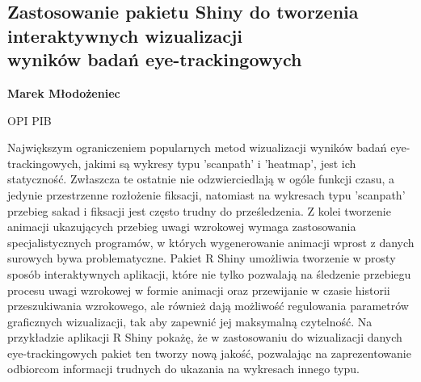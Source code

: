 \documentclass[\main/boa.tex]{subfiles}
\begin{document}
\subsection{Zastosowanie pakietu Shiny do tworzenia interaktywnych wizualizacji\\ wyników badań eye-trackingowych}

\begin{minipage}{0.915\textwidth}
	\centering
  {\bf {} Marek Młodożeniec}
\end{minipage}


\begin{affiliations}
\begin{minipage}{0.915\textwidth}
\centering
OPI PIB  \\[-2pt]
\end{minipage}
\end{affiliations}

\vskip 0.3cm
Największym ograniczeniem popularnych metod wizualizacji wyników badań \break eye-trackingowych, jakimi są wykresy typu 'scanpath' i 'heatmap', jest ich statyczność. Zwłaszcza te ostatnie nie odzwierciedlają w ogóle funkcji czasu, a jedynie przestrzenne rozłożenie fiksacji, natomiast na wykresach typu 'scanpath' przebieg sakad i fiksacji jest często trudny do prześledzenia. Z kolei tworzenie animacji ukazujących przebieg uwagi wzrokowej wymaga zastosowania specjalistycznych programów, w których \break wygenerowanie animacji wprost z danych surowych bywa problematyczne. Pakiet R Shiny umożliwia tworzenie w prosty sposób interaktywnych aplikacji, które nie tylko pozwalają na śledzenie przebiegu procesu uwagi wzrokowej w formie animacji oraz przewijanie w czasie historii przeszukiwania wzrokowego, ale również dają możliwość regulowania parametrów graficznych wizualizacji, tak aby zapewnić jej maksymalną czytelność. Na przykładzie aplikacji R Shiny pokażę, że w zastosowaniu do wizualizacji danych eye-trackingowych pakiet ten tworzy nową jakość, pozwalając na zaprezentowanie odbiorcom informacji trudnych do ukazania na wykresach innego typu. 
\end{document}
